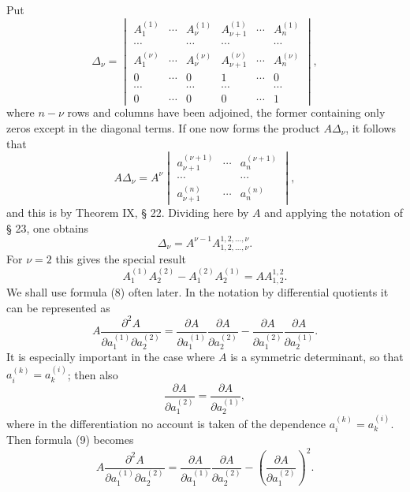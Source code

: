 \documentclass[11pt]{article}
\begin{document}
Put
\[
\Delta_\nu=\begin{vmatrix}
 A_1^{(1)}&\cdots&A_\nu^{(1)}&A_{\nu+1}^{(1)}&\cdots&A_n^{(1)}\\
 \cdots&&\cdots&\cdots&&\cdots\\
 A_1^{(\nu)}&\cdots&A_\nu^{(\nu)}&A_{\nu+1}^{(\nu)}&\cdots&A_n^{(\nu)}\\
 0&\cdots&0&1&\cdots&0\\
 \cdots&&\cdots&\cdots&&\cdots\\
 0&\cdots&0&0&\cdots&1
\end{vmatrix},\tag{5}
\]
where $n-\nu$ rows and columns have been adjoined, the former containing only zeros except in the diagonal terms. If one now forms the product $A\Delta_\nu$, it follows that
\[
 A\Delta_\nu=A^\nu
 \begin{vmatrix}
 a_{\nu+1}^{(\nu+1)}&\cdots&a_n^{(\nu+1)}\\
 \cdots&&\cdots\\
 a_{\nu+1}^{(n)}&\cdots&a_n^{(n)}
 \end{vmatrix},\tag{6}
\]
and this is by Theorem IX, § 22. Dividing here by $A$ and applying the notation of § 23, one obtains
\begin{equation}
 \Delta_\nu=A^{\nu-1}A_{1,2,\ldots,\nu}^{1,2,\ldots,\nu}.\tag{7}
\end{equation}
For $\nu=2$ this gives the special result
\begin{equation}
 A_1^{(1)}A_2^{(2)}-A_1^{(2)}A_2^{(1)}=A A_{1,2}^{1,2}.\tag{8}
\end{equation}
We shall use formula (8) often later. In the notation by differential quotients it can be represented as
\begin{equation}
 A\frac{\partial^2A}{\partial a_1^{(1)}\partial a_2^{(2)}}
 =\frac{\partial A}{\partial a_1^{(1)}}\frac{\partial A}{\partial a_2^{(2)}}
 -\frac{\partial A}{\partial a_1^{(2)}}\frac{\partial A}{\partial a_2^{(1)}}.\tag{9}
\end{equation}
It is especially important in the case where $A$ is a symmetric determinant, so that $a_i^{(k)}=a_k^{(i)}$; then also
\[
 \frac{\partial A}{\partial a_1^{(2)}}=\frac{\partial A}{\partial a_2^{(1)}},
\]
where in the differentiation no account is taken of the dependence $a_i^{(k)}=a_k^{(i)}$. Then formula (9) becomes
\begin{equation}
 A\frac{\partial^2A}{\partial a_1^{(1)}\partial a_2^{(2)}}
 =\frac{\partial A}{\partial a_1^{(1)}}\frac{\partial A}{\partial a_2^{(2)}}
 -\left(\frac{\partial A}{\partial a_1^{(2)}}\right)^2.\tag{10}
\end{equation}
\end{document}
